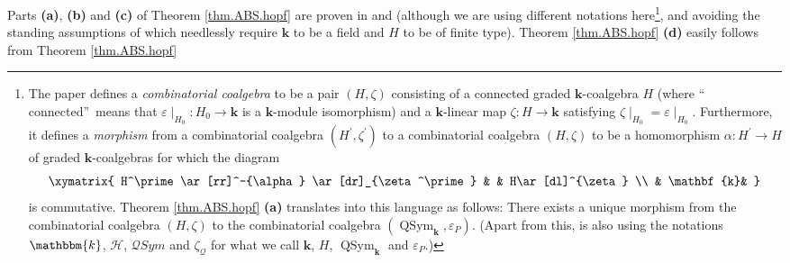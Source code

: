 \documentclass
[numbers=enddot,12pt,final,onecolumn,notitlepage,abstracton]{scrartcl}%
\theoremstyle{definition}
\newcommand{\kk}{\mathbf{k}}
\begin{document}
Parts \textbf{(a)}, \textbf{(b)} and \textbf{(c)} of Theorem
\ref{thm.ABS.hopf} are proven in \cite[proof of Theorem 4.1]{ABS} and
\cite[proof of Theorem 7.1.3]{Reiner} (although we are using different
notations here\footnote{The paper \cite{ABS} defines a \textit{combinatorial
coalgebra} to be a pair $\left(  H,\zeta\right)  $ consisting of a connected
graded $\mathbf{k}$-coalgebra $H$ (where \textquotedblleft
connected\textquotedblright\ means that $\varepsilon\mid_{H_{0}}%
:H_{0}\rightarrow\mathbf{k}$ is a $\mathbf{k}$-module isomorphism) and a
$\mathbf{k}$-linear map $\zeta:H\rightarrow\mathbf{k}$ satisfying $\zeta
\mid_{H_{0}}=\varepsilon\mid_{H_{0}}$. Furthermore, it defines a
\textit{morphism} from a combinatorial coalgebra $\left(  H^{\prime}%
,\zeta^{\prime}\right)  $ to a combinatorial coalgebra $\left(  H,\zeta
\right)  $ to be a homomorphism $\alpha:H^{\prime}\rightarrow H$ of graded
$\mathbf{k}$-coalgebras for which the diagram%
\[%
\xymatrix{
H^\prime\ar[rr]^-{\alpha} \ar[dr]_{\zeta^\prime} & & H\ar[dl]^{\zeta} \\
& \kk&
}%
\]
is commutative. Theorem \ref{thm.ABS.hopf} \textbf{(a)} translates into this
language as follows: There exists a unique morphism from the combinatorial
coalgebra $\left(  H,\zeta\right)  $ to the combinatorial coalgebra $\left(
\operatorname*{QSym}\nolimits_{\mathbf{k}},\varepsilon_{P}\right)  $. (Apart
from this, \cite{ABS} is also using the notations $\mathbbm{k}$, $\mathcal{H}%
$, $\mathcal{Q}Sym$ and $\zeta_{\mathcal{Q}}$ for what we call $\mathbf{k}$,
$H$, $\operatorname*{QSym}\nolimits_{\mathbf{k}}$ and $\varepsilon_{P}$.)},
and avoiding the standing assumptions of \cite{ABS} which needlessly require
$\mathbf{k}$ to be a field and $H$ to be of finite type). Theorem
\ref{thm.ABS.hopf} \textbf{(d)} easily follows from Theorem \ref{thm.ABS.hopf}
\end{document}
